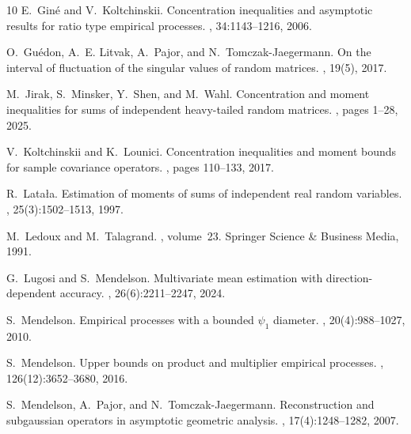\documentclass[11pt]{amsart}
\theoremstyle{definition}
\numberwithin{equation}{section}
\begin{document}
\begin{thebibliography}{10}
E.~Gin{\'e} and V.~Koltchinskii.
\newblock Concentration inequalities and asymptotic results for ratio type
  empirical processes.
, 34:1143--1216, 2006.

O.~Gu{\'e}don, A.~E. Litvak, A.~Pajor, and N.~Tomczak-Jaegermann.
\newblock On the interval of fluctuation of the singular values of random
  matrices.
, 19(5), 2017.

M.~Jirak, S.~Minsker, Y.~Shen, and M.~Wahl.
\newblock Concentration and moment inequalities for sums of independent
  heavy-tailed random matrices.
, pages 1--28, 2025.

V.~Koltchinskii and K.~Lounici.
\newblock Concentration inequalities and moment bounds for sample covariance
  operators.
, pages 110--133, 2017.

R.~Lata{\l}a.
\newblock Estimation of moments of sums of independent real random variables.
, 25(3):1502--1513, 1997.

M.~Ledoux and M.~Talagrand.
,
  volume~23.
\newblock Springer Science \& Business Media, 1991.

G.~Lugosi and S.~Mendelson.
\newblock Multivariate mean estimation with direction-dependent accuracy.
, 26(6):2211--2247,
  2024.

S.~Mendelson.
\newblock Empirical processes with a bounded $\psi_1$ diameter.
, 20(4):988--1027, 2010.

S.~Mendelson.
\newblock Upper bounds on product and multiplier empirical processes.
,
  126(12):3652--3680, 2016.

S.~Mendelson, A.~Pajor, and N.~Tomczak-Jaegermann.
\newblock Reconstruction and subgaussian operators in asymptotic geometric
  analysis.
, 17(4):1248--1282, 2007.


\end{thebibliography}
\end{document}
